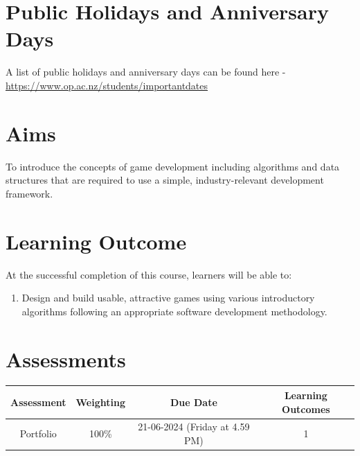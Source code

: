 \documentclass{article}
\begin{document}
\section*{Public Holidays and Anniversary Days}
A list of public holidays and anniversary days can be found here - \href{https://www.op.ac.nz/students/importantdates}{https://www.op.ac.nz/students/importantdates}

\section*{Aims}
To introduce the concepts of game development including algorithms and data structures that are required to use a simple, industry-relevant development framework.

\section*{Learning Outcome}
At the successful completion of this course, learners will be able to:
\begin{enumerate}
	\item Design and build usable, attractive games using various introductory algorithms following an appropriate software development methodology.
\end{enumerate}

\section*{Assessments}
\renewcommand{\arraystretch}{1.5}
\begin{tabular}{|c|c|c|c|}
	\hline
	\textbf{Assessment}                                 & \textbf{Weighting} & \textbf{Due Date}            & \textbf{Learning Outcomes} \\ \hline
	\small Portfolio                        & \small 100\%        & \small 21-06-2024 (Friday at 4.59 PM)  & \small 1                   \\ \hline
\end{tabular}
\end{document}
